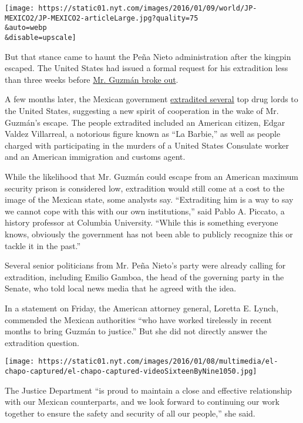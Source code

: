 \texttt{[image: https://static01.nyt.com/images/2016/01/09/world/JP-MEXICO2/JP-MEXICO2-articleLarge.jpg?quality=75\\\&auto=webp\\\&disable=upscale]}

But that stance came to haunt the Peña Nieto administration after the
kingpin escaped. The United States had issued a formal request for his
extradition less than three weeks before
\href{http://www.nytimes.com/2015/07/15/world/americas/mexico-hunts-joaquin-chapo-guzman-united-states-offer-help.html?hp\&action=click\&pgtype=Homepage\&module=first-column-region\&region=top-news\&WT.nav=top-news}{Mr.
Guzmán broke out}.

A few months later, the Mexican government
\href{http://www.nytimes.com/2015/10/01/world/americas/mexico-signaling-shift-extradites-drug-kingpins-to-united-states.html}{extradited
several} top drug lords to the United States, suggesting a new spirit of
cooperation in the wake of Mr. Guzmán's escape. The people extradited
included an American citizen, Edgar Valdez Villarreal, a notorious
figure known as ``La Barbie,'' as well as people charged with
participating in the murders of a United States Consulate worker and an
American immigration and customs agent.

While the likelihood that Mr. Guzmán could escape from an American
maximum security prison is considered low, extradition would still come
at a cost to the image of the Mexican state, some analysts say.
``Extraditing him is a way to say we cannot cope with this with our own
institutions,'' said Pablo A. Piccato, a history professor at Columbia
University. ``While this is something everyone knows, obviously the
government has not been able to publicly recognize this or tackle it in
the past.''

Several senior politicians from Mr. Peña Nieto's party were already
calling for extradition, including Emilio Gamboa, the head of the
governing party in the Senate, who told local news media that he agreed
with the idea.

In a statement on Friday, the American attorney general, Loretta E.
Lynch, commended the Mexican authorities ``who have worked tirelessly in
recent months to bring Guzmán to justice.'' But she did not directly
answer the extradition question.

\texttt{[image: https://static01.nyt.com/images/2016/01/08/multimedia/el-chapo-captured/el-chapo-captured-videoSixteenByNine1050.jpg]}

The Justice Department ``is proud to maintain a close and effective
relationship with our Mexican counterparts, and we look forward to
continuing our work together to ensure the safety and security of all
our people,'' she said.

